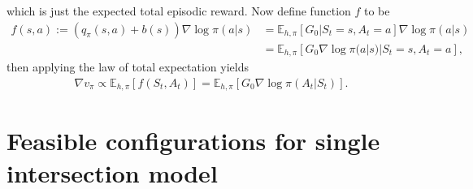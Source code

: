 \documentclass[a4paper]{report}
\theoremstyle{definition}
\theoremstyle{plain}
\begin{document}
which is just the expected total episodic reward.
%
Now define function $f$ to be
\begin{subequations}
\begin{align}
  f(s, a) := (q_{\pi}(s, a) + b(s))\nabla \log \pi(a | s) &= \mathbb{E}_{h,\pi} \left[ G_{0} | S_{t} = s, A_{t} = a \right] \nabla \log \pi(a | s) \\
  &= \mathbb{E}_{h,\pi} \left[ G_{0} \nabla \log \pi(a | s) | S_{t} = s, A_{t} = a \right] ,
\end{align}
\end{subequations}
then applying the law of total expectation yields
\begin{align}
  \nabla v_{\pi} \propto \mathbb{E}_{h,\pi}[f(S_{t}, A_{t})] =  \mathbb{E}_{h, \pi} \left[ G_{0} \nabla \log \pi(A_{t} | S_{t}) \right] .
\end{align}


\chapter{Feasible configurations for single intersection model}\label{app:configuration-space}
\end{document}
